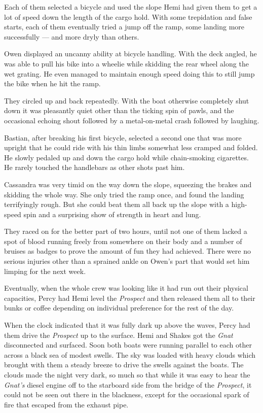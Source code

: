 \documentclass[
]{scrbook}
\begin{document}
Each of them selected a bicycle and used the slope Hemi had given them
to get a lot of speed down the length of the cargo hold. With some
trepidation and false starts, each of them eventually tried a jump off
the ramp, some landing more successfully --- and more dryly than others.

Owen displayed an uncanny ability at bicycle handling. With the deck
angled, he was able to pull his bike into a wheelie while skidding the
rear wheel along the wet grating. He even managed to maintain enough
speed doing this to still jump the bike when he hit the ramp.

They circled up and back repeatedly. With the boat otherwise completely
shut down it was pleasantly quiet other than the ticking spin of pawls,
and the occasional echoing shout followed by a metal-on-metal crash
followed by laughing.

Bastian, after breaking his first bicycle, selected a second one that
was more upright that he could ride with his thin limbs somewhat less
cramped and folded. He slowly pedaled up and down the cargo hold while
chain-smoking cigarettes. He rarely touched the handlebars as other
shots past him.

Cassandra was very timid on the way down the slope, squeezing the brakes
and skidding the whole way. She only tried the ramp once, and found the
landing terrifyingly rough. But she could beat them all back up the
slope with a high-speed spin and a surprising show of strength in heart
and lung.

They raced on for the better part of two hours, until not one of them
lacked a spot of blood running freely from somewhere on their body and a
number of bruises as badges to prove the amount of fun they had
achieved. There were no serious injuries other than a sprained ankle on
Owen's part that would set him limping for the next week.

Eventually, when the whole crew was looking like it had run out their
physical capacities, Percy had Hemi level the \emph{Prospect} and then
released them all to their bunks or coffee depending on individual
preference for the rest of the day.

When the clock indicated that it was fully dark up above the waves,
Percy had them drive the \emph{Prospect} up to the surface. Hemi and
Shakes got the \emph{Gnat} disconnected and surfaced. Soon both boats
were running parallel to each other across a black sea of modest swells.
The sky was loaded with heavy clouds which brought with them a steady
breeze to drive the swells against the boats. The clouds made the night
very dark, so much so that while it was easy to hear the \emph{Gnat's}
diesel engine off to the starboard side from the bridge of the
\emph{Prospect}, it could not be seen out there in the blackness, except
for the occasional spark of fire that escaped from the exhaust pipe.
\end{document}
